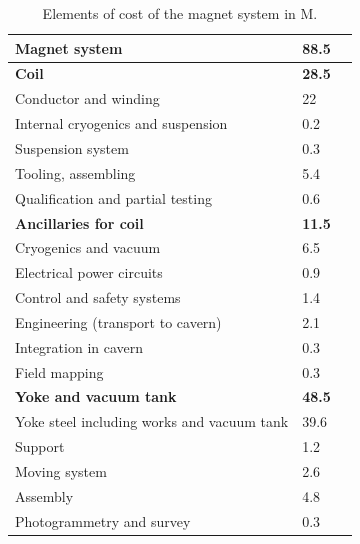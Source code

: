 
\begin{table}\hspace*{-0cm}\small 
\begin{tabular}[h!]{ l p{0.2\hsize}  p{0.1\hsize} }
\toprule
\textbf{Magnet system} & \textbf{88.5}\\
\midrule
\textbf{Coil} & \textbf{28.5}\\
\midrule
Conductor and winding & 22\\
Internal cryogenics and suspension &  0.2\\
Suspension system & 0.3 \\
Tooling, assembling & 5.4 \\
Qualification and partial testing & 0.6\\
\midrule
\textbf{Ancillaries for coil} & \textbf{11.5}\\
\midrule
Cryogenics and vacuum & 6.5\\
Electrical power circuits & 0.9\\
Control and safety systems& 1.4 \\
Engineering (transport to cavern) & 2.1\\
Integration in cavern& 0.3 \\
Field mapping&0.3\\
\midrule
\textbf{Yoke and vacuum tank} & \textbf{48.5}\\
\midrule
Yoke steel including works and vacuum tank& 39.6\\
Support &1.2\\
Moving system& 2.6\\
Assembly& 4.8\\
Photogrammetry and survey& 0.3 \\
\bottomrule
\end{tabular}
\caption{\label{magnet_cost}Elements of cost of the magnet system in M\texteuro.}
\end{table}



